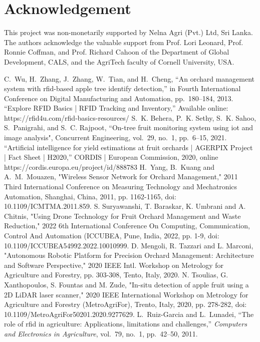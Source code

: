 \documentclass[journal]{IEEEtran}
\begin{document}
\section{Acknowledgement}
This project was non-monetarily supported by Nelna Agri (Pvt.) Ltd, Sri Lanka. The authors acknowledge the valuable support from Prof. Lori Leonard, Prof. Ronnie Coffman, and Prof. Richard Cahoon of the Department of Global Development, CALS, and the AgriTech faculty of Cornell University, USA.
\balance
\begin{thebibliography}{1}
C.~Wu, H.~Zhang, J.~Zhang, W.~Tian, and H.~Cheng, ``An orchard management system with rfid-based apple tree identify detection,'' in Fourth International Conference on Digital Manufacturing and Automation, pp.~180--184, 2013.
“Explore RFID Basics | RFID Tracking and Inventory,” Available online: https://rfid4u.com/rfid-basics-resources/
S.~K. Behera, P.~K. Sethy, S.~K. Sahoo, S.~Panigrahi, and S.~C. Rajpoot, ``On-tree fruit monitoring system using iot and image analysis", Concurrent Engineering, vol.~29, no.~1, pp.~6--15, 2021.
“Artificial intelligence for yield estimations at fruit orchards | AGERPIX Project | Fact Sheet | H2020,” CORDIS | European Commission, 2020, online  https://cordis.europa.eu/project/id/888783
H.~Yang, B.~Kuang and A.~M.~Mouazen, "Wireless Sensor Network for Orchard Management," 2011 Third International Conference on Measuring Technology and Mechatronics Automation, Shanghai, China, 2011, pp. 1162-1165, doi: 10.1109/ICMTMA.2011.859.
S. Suryawanshi, T. Baraskar, K. Umbrani and A. Chitnis, "Using Drone Technology for Fruit Orchard Management and Waste Reduction," 2022 6th International Conference On Computing, Communication, Control And Automation (ICCUBEA, Pune, India, 2022, pp. 1-9, doi: 10.1109/ICCUBEA54992.2022.10010999.
D. Mengoli, R. Tazzari and L. Marconi, "Autonomous Robotic Platform for Precision Orchard Management: Architecture and Software Perspective," 2020 IEEE Intl.  Workshop on Metrology for Agriculture and Forestry, pp. 303-308, Tento, Italy, 2020.
N. Tsoulias, G. Xanthopoulos, S. Fountas and M. Zude, "In-situ detection of apple fruit using a 2D LiDAR laser scanner," 2020 IEEE International Workshop on Metrology for Agriculture and Forestry (MetroAgriFor), Trento, Italy, 2020, pp. 278-282, doi: 10.1109/MetroAgriFor50201.2020.9277629.
L.~Ruiz-Garcia and L.~Lunadei, ``The role of rfid in agriculture: Applications, limitations and challenges,'' {\em Computers and Electronics in Agriculture}, vol.~79, no.~1, pp.~42--50, 2011.

\end{thebibliography}
\end{document}
